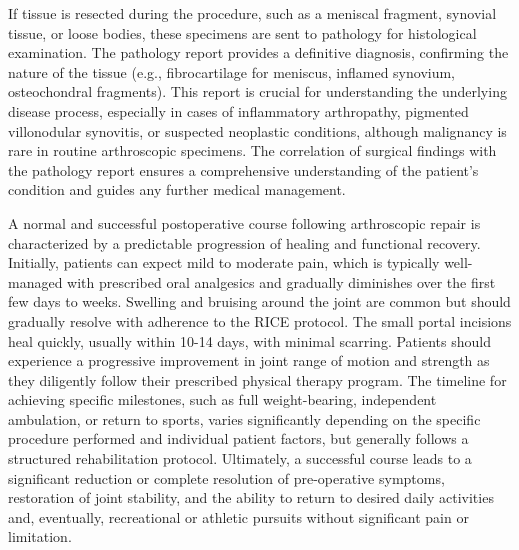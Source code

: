 If tissue is resected during the procedure, such as a meniscal fragment, synovial tissue, or loose bodies, these specimens are sent to pathology for histological examination. The pathology report provides a definitive diagnosis, confirming the nature of the tissue (e.g., fibrocartilage for meniscus, inflamed synovium, osteochondral fragments). This report is crucial for understanding the underlying disease process, especially in cases of inflammatory arthropathy, pigmented villonodular synovitis, or suspected neoplastic conditions, although malignancy is rare in routine arthroscopic specimens. The correlation of surgical findings with the pathology report ensures a comprehensive understanding of the patient's condition and guides any further medical management.

A normal and successful postoperative course following arthroscopic repair is characterized by a predictable progression of healing and functional recovery. Initially, patients can expect mild to moderate pain, which is typically well-managed with prescribed oral analgesics and gradually diminishes over the first few days to weeks. Swelling and bruising around the joint are common but should gradually resolve with adherence to the RICE protocol. The small portal incisions heal quickly, usually within 10-14 days, with minimal scarring. Patients should experience a progressive improvement in joint range of motion and strength as they diligently follow their prescribed physical therapy program. The timeline for achieving specific milestones, such as full weight-bearing, independent ambulation, or return to sports, varies significantly depending on the specific procedure performed and individual patient factors, but generally follows a structured rehabilitation protocol. Ultimately, a successful course leads to a significant reduction or complete resolution of pre-operative symptoms, restoration of joint stability, and the ability to return to desired daily activities and, eventually, recreational or athletic pursuits without significant pain or limitation.

